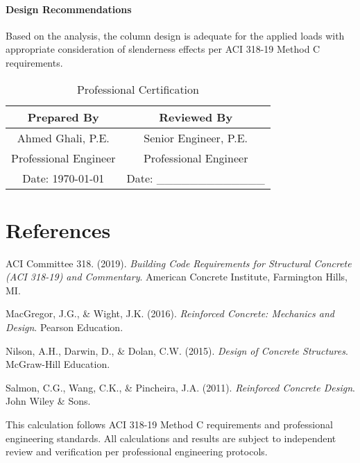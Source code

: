 \documentclass[
  10pt,
  letterpaper,
  twocolumn
]{article}
\begin{document}
\paragraph{Design Recommendations}
Based on the analysis, the column design is adequate for the applied loads with appropriate consideration of slenderness effects per ACI 318-19 Method C requirements.

\begin{table}[h]
\centering
\caption*{Professional Certification}
\begin{tabular}{@{}cc@{}}
\toprule
\textbf{Prepared By} & \textbf{Reviewed By} \\
\midrule
Ahmed Ghali, P.E. & Senior Engineer, P.E. \\
Professional Engineer & Professional Engineer \\
Date: \today & Date: \_\_\_\_\_\_\_\_\_\_\_\_\_ \\
\bottomrule
\end{tabular}
\end{table}

\section*{References}

\begin{thebibliography}{9}
ACI Committee 318. (2019). \textit{Building Code Requirements for Structural Concrete (ACI 318-19) and Commentary}. American Concrete Institute, Farmington Hills, MI.

MacGregor, J.G., \& Wight, J.K. (2016). \textit{Reinforced Concrete: Mechanics and Design}. Pearson Education.

Nilson, A.H., Darwin, D., \& Dolan, C.W. (2015). \textit{Design of Concrete Structures}. McGraw-Hill Education.

Salmon, C.G., Wang, C.K., \& Pincheira, J.A. (2011). \textit{Reinforced Concrete Design}. John Wiley \& Sons.
\end{thebibliography}

\vspace{0.3cm}
{\scriptsize\textcolor{ghaligray}{
This calculation follows ACI 318-19 Method C requirements and professional engineering standards. All calculations and results are subject to independent review and verification per professional engineering protocols.
}}
\end{document}
